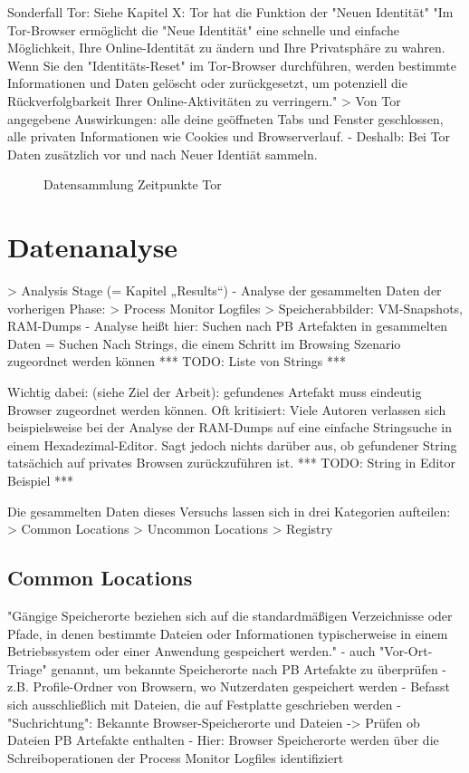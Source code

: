 	Sonderfall Tor:
		Siehe Kapitel X: Tor hat die Funktion der "Neuen Identität" %
			"Im Tor-Browser ermöglicht die "Neue Identität" eine schnelle und einfache Möglichkeit, Ihre Online-Identität zu ändern und Ihre Privatsphäre zu wahren. Wenn Sie den "Identitäts-Reset" im Tor-Browser durchführen, werden bestimmte Informationen und Daten gelöscht oder zurückgesetzt, um potenziell die Rückverfolgbarkeit Ihrer Online-Aktivitäten zu verringern."
			> Von Tor angegebene Auswirkungen:  alle deine geöffneten Tabs und Fenster geschlossen, alle privaten Informationen wie Cookies und Browserverlauf.
		- Deshalb: Bei Tor Daten zusätzlich vor und nach Neuer Identiät sammeln.
		\begin{figure}[h!]
			\centering
			\small
			\centerline{\resizebox{\linewidth}{!}{}}
			\caption{Datensammlung Zeitpunkte Tor}
			\label{fig:jes}
		\end{figure}
	
	

\section{Datenanalyse}

> Analysis Stage (= Kapitel „Results“)
- Analyse der gesammelten Daten der vorherigen Phase: 
	> Process Monitor Logfiles	
	> Speicherabbilder: VM-Snapshots, RAM-Dumps
- Analyse heißt hier: Suchen nach PB Artefakten in gesammelten Daten
= Suchen Nach Strings, die einem Schritt im Browsing Szenario zugeordnet werden können
*** TODO: Liste von Strings ***

Wichtig dabei: (siehe Ziel der Arbeit): gefundenes Artefakt muss eindeutig Browser zugeordnet werden können.
Oft kritisiert: Viele Autoren verlassen sich beispielsweise bei der Analyse der RAM-Dumps auf eine einfache Stringsuche in einem Hexadezimal-Editor.
Sagt jedoch nichts darüber aus, ob gefundener String tatsächich auf privates Browsen zurückzuführen ist.
*** TODO: String in Editor Beispiel ***

Die gesammelten Daten dieses Versuchs lassen sich in drei Kategorien aufteilen:
> Common Locations
> Uncommon Locations	
> Registry

\subsection{Common Locations}

"Gängige Speicherorte beziehen sich auf die standardmäßigen Verzeichnisse oder Pfade, in denen bestimmte Dateien oder Informationen typischerweise in einem Betriebssystem oder einer Anwendung gespeichert werden."	
- auch "Vor-Ort-Triage" \cite{Horsman.2019} genannt, um bekannte Speicherorte nach PB Artefakte zu überprüfen
- z.B. Profile-Ordner von Browsern, wo Nutzerdaten gespeichert werden
- Befasst sich ausschließlich mit Dateien, die auf Festplatte geschrieben werden
- "Suchrichtung": Bekannte Browser-Speicherorte und Dateien -> Prüfen ob Dateien PB Artefakte enthalten
- Hier: Browser Speicherorte werden über die Schreiboperationen der Process Monitor Logfiles identifiziert 

